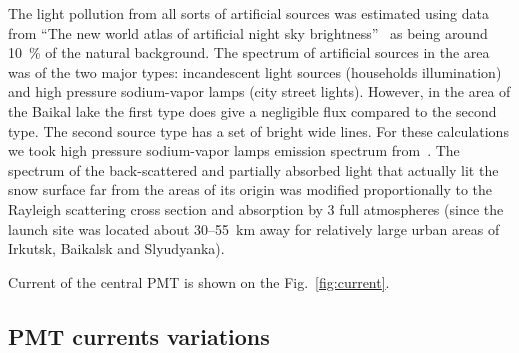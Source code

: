 \documentclass[final,5p,times,twocolumn]{elsarticle}
\begin{document}
The light pollution from all sorts of artificial sources was estimated using data from ``The new world atlas of artificial night sky brightness''~\cite{Falchie1600377} as being around 10~\% of the natural background. The spectrum of artificial sources in the area was of the two major types: incandescent light sources (households illumination) and high pressure sodium-vapor lamps (city street lights). However, in the area of the Baikal lake the first type does give a negligible flux compared to the second type. The second source type has a set of bright wide lines. For these calculations we took high pressure sodium-vapor lamps emission spectrum from~\cite{Elvige2010}. The spectrum of the back-scattered and partially absorbed light that actually lit the snow surface far from the areas of its origin was modified proportionally to the Rayleigh scattering cross section and absorption by 3 full atmospheres (since the launch site was located about 30--55~km away for relatively large urban areas of Irkutsk, Baikalsk and Slyudyanka).

Current of the central PMT is shown on the Fig.~\ref{fig:current}. 



\subsection{PMT currents variations}
\end{document}
